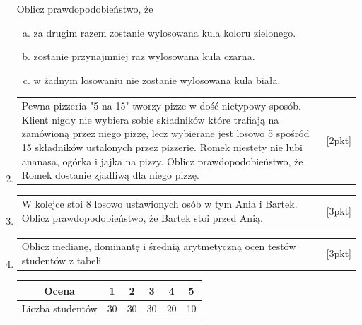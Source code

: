 \documentclass[12pt,a4paper]{article}
\begin{document}
\begin{enumerate}[1.]
		Oblicz prawdopodobieństwo, że
		
		\begin{enumerate}[a)]
			\item za drugim razem zostanie wylosowana kula koloru zielonego.
			\item zostanie przynajmniej raz wylosowana kula czarna.
			\item w żadnym losowaniu nie zostanie wylosowana kula biała.
		\end{enumerate}
		
		
		\item  \begin{tabular}{p{13cm} r}
			Pewna pizzeria "5 na 15" tworzy pizze w dość nietypowy sposób. Klient nigdy nie wybiera sobie składników które trafiają na zamówioną przez niego pizzę, lecz wybierane jest losowo 5 spośród 15 składników ustalonych przez pizzerie. Romek niestety nie lubi ananasa, ogórka i jajka na pizzy. Oblicz prawdopodobieństwo, że Romek dostanie zjadliwą dla niego pizzę.  &[2pkt]\\ 
		\end{tabular}
		
		\item  \begin{tabular}{p{13cm} r}
			W kolejce stoi 8 losowo ustawionych osób w tym Ania i Bartek. Oblicz prawdopodobieństwo, że Bartek stoi przed Anią.  &[3pkt]\\ 
		\end{tabular}
		
		\item  \begin{tabular}{p{13cm} r}
			Oblicz medianę, dominantę i średnią arytmetyczną ocen testów studentów z tabeli &[3pkt]\\ 
		\end{tabular}
		
		\begin{tabular}{|c|c|c|c|c|c|}
			\hline
			Ocena&1&2&3&4&5\\
			\hline
			Liczba studentów&30&30&30&20&10\\
			\hline
		\end{tabular}
		
	\end{enumerate}
	
\end{document}
